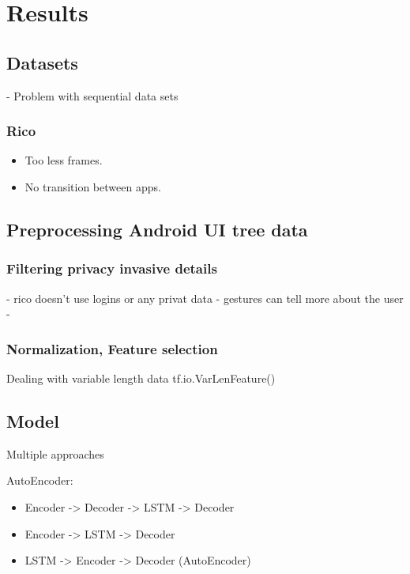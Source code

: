 \chapter{Results}

\section{Datasets}

- Problem with sequential data sets

\subsection{Rico}

\begin{itemize}
  \item Too less frames.
  \item No transition between apps.
\end{itemize}

\section{Preprocessing Android UI tree data}
\subsection{Filtering privacy invasive details}

- rico doesn't use logins or any privat data
- gestures can tell more about the user
-


\subsection{Normalization, Feature selection}

Dealing with variable length data tf.io.VarLenFeature()

\section{Model}


Multiple approaches


AutoEncoder:

\begin{itemize}
  \item Encoder -> Decoder -> LSTM -> Decoder
  \item Encoder -> LSTM -> Decoder
  \item LSTM -> Encoder -> Decoder (AutoEncoder)
\end{itemize}

